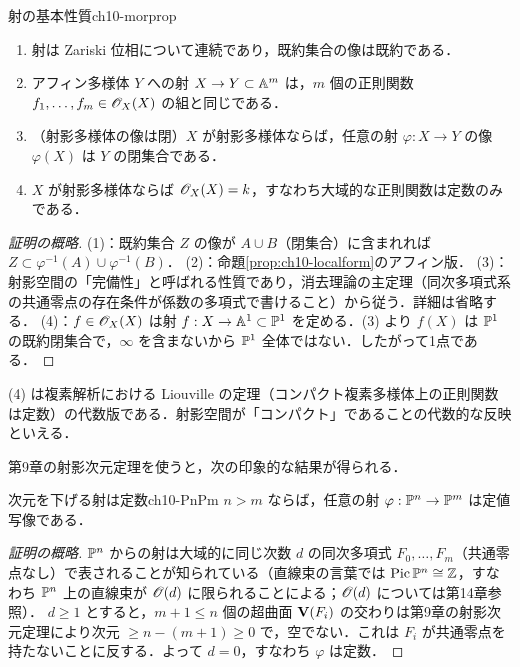 \begin{myprop}{射の基本性質}{ch10-morprop}
\begin{enumerate}
  \item 射は Zariski 位相について連続であり，既約集合の像は既約である．
  \item アフィン多様体 $Y$ への射 $X\to Y\subset\mathbb{A}^m$ は，$m$ 個の正則関数 $f_1,\dots,f_m\in\mathscr{O}_X(X)$ の組と同じである．
  \item （射影多様体の像は閉）$X$ が射影多様体ならば，任意の射 $\varphi:X\to Y$ の像 $\varphi(X)$ は $Y$ の閉集合である．
  \item $X$ が射影多様体ならば $\mathscr{O}_X(X)=k$，すなわち大域的な正則関数は定数のみである．
\end{enumerate}
\end{myprop}

\begin{proof}[証明の概略]
(1)：既約集合 $Z$ の像が $A\cup B$（閉集合）に含まれれば $Z\subset\varphi^{-1}(A)\cup\varphi^{-1}(B)$．
(2)：命題\ref{prop:ch10-localform}のアフィン版．
(3)：射影空間の「完備性」と呼ばれる性質であり，消去理論の主定理（同次多項式系の共通零点の存在条件が係数の多項式で書けること）から従う．詳細は省略する．
(4)：$f\in\mathscr{O}_X(X)$ は射 $f:X\to\mathbb{A}^1\subset\mathbb{P}^1$ を定める．(3) より $f(X)$ は $\mathbb{P}^1$ の既約閉集合で，$\infty$ を含まないから $\mathbb{P}^1$ 全体ではない．したがって1点である．
\end{proof}

(4) は複素解析における Liouville の定理（コンパクト複素多様体上の正則関数は定数）の代数版である．射影空間が「コンパクト」であることの代数的な反映といえる．

第9章の射影次元定理を使うと，次の印象的な結果が得られる．

\begin{mycor}{次元を下げる射は定数}{ch10-PnPm}
$n>m$ ならば，任意の射 $\varphi:\mathbb{P}^n\to\mathbb{P}^m$ は定値写像である．
\end{mycor}

\begin{proof}[証明の概略]
$\mathbb{P}^n$ からの射は大域的に同じ次数 $d$ の同次多項式 $F_0,\dots,F_m$（共通零点なし）で表されることが知られている（直線束の言葉では $\operatorname{Pic}\mathbb{P}^n\cong\mathbb{Z}$，すなわち $\mathbb{P}^n$ 上の直線束が $\mathscr{O}(d)$ に限られることによる；$\mathscr{O}(d)$ については第14章参照）．
$d\ge1$ とすると，$m+1\le n$ 個の超曲面 $\mathbf{V}(F_i)$ の交わりは第9章の射影次元定理により次元 $\ge n-(m+1)\ge0$ で，空でない．これは $F_i$ が共通零点を持たないことに反する．よって $d=0$，すなわち $\varphi$ は定数．
\end{proof}

